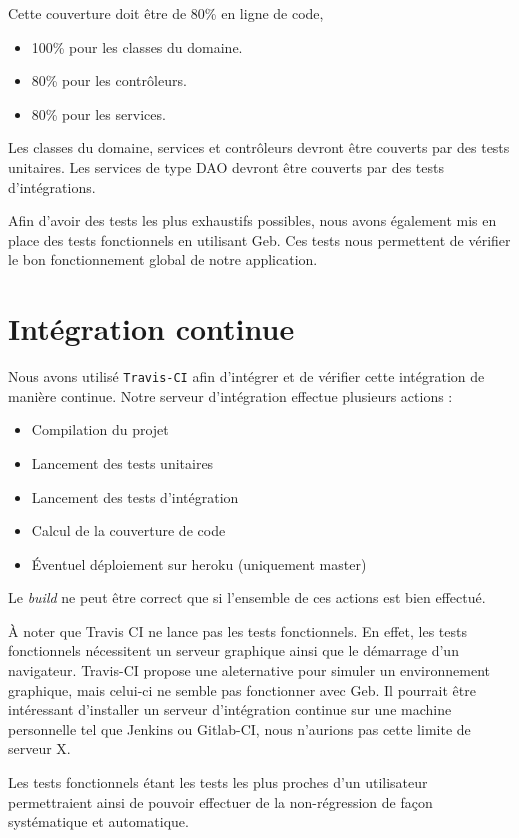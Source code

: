 \documentclass[12pt,a4paper,oneside]{book}
\begin{document}
	Cette couverture doit être de 80\% en ligne de code, 
	\begin{itemize}
		\item 100\% pour les classes du domaine.
		\item 80\% pour les contrôleurs.
		\item 80\% pour les services.
	\end{itemize}	
	
	Les classes du domaine, services et contrôleurs devront être couverts par des tests unitaires. Les services de type DAO devront être couverts par des tests d'intégrations.
	
	Afin d’avoir des tests les plus exhaustifs possibles, nous avons également mis en place des tests fonctionnels en utilisant Geb. Ces tests nous permettent de vérifier le bon fonctionnement global de notre application.
	
	\section{Intégration continue}
	Nous avons utilisé \texttt{Travis-CI} afin d’intégrer et de vérifier cette intégration de manière continue. Notre serveur d’intégration effectue plusieurs actions : 
	\begin{itemize}
		\item Compilation du projet 
		\item Lancement des tests unitaires
		\item Lancement des tests d’intégration
		\item Calcul de la couverture de code
		\item Éventuel déploiement sur heroku (uniquement master)
	\end{itemize}
	Le\textit{ build }ne peut être correct  que si l'ensemble de ces actions est bien effectué. 

	\begin{exemple}
	À noter que Travis CI ne lance pas les tests fonctionnels. En effet, les tests fonctionnels nécessitent un serveur graphique
	ainsi que le démarrage d’un navigateur. Travis-CI propose une aleternative pour simuler un environnement graphique, mais
	celui-ci ne semble pas fonctionner avec Geb. Il pourrait être intéressant d'installer un serveur d’intégration continue sur une
	machine personnelle tel que Jenkins ou Gitlab-CI, nous n'aurions pas cette limite de serveur X.
	\end{exemple}

	Les tests fonctionnels étant les tests les plus proches d’un utilisateur permettraient ainsi de pouvoir effectuer de la non-régression de façon systématique et automatique.
	
\end{document}
